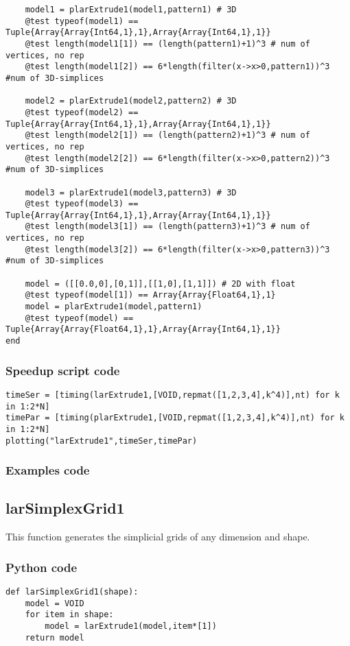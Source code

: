 \documentclass[a4paper,12pt,titlepage]{article}					%
\begin{document}
\begin{Verbatim}
	model1 = plarExtrude1(model1,pattern1) # 3D
	@test typeof(model1) == Tuple{Array{Array{Int64,1},1},Array{Array{Int64,1},1}}
	@test length(model1[1]) == (length(pattern1)+1)^3 # num of vertices, no rep
	@test length(model1[2]) == 6*length(filter(x->x>0,pattern1))^3 #num of 3D-simplices
	
	model2 = plarExtrude1(model2,pattern2) # 3D
	@test typeof(model2) == Tuple{Array{Array{Int64,1},1},Array{Array{Int64,1},1}}
	@test length(model2[1]) == (length(pattern2)+1)^3 # num of vertices, no rep
	@test length(model2[2]) == 6*length(filter(x->x>0,pattern2))^3 #num of 3D-simplices
	
	model3 = plarExtrude1(model3,pattern3) # 3D
	@test typeof(model3) == Tuple{Array{Array{Int64,1},1},Array{Array{Int64,1},1}}
	@test length(model3[1]) == (length(pattern3)+1)^3 # num of vertices, no rep
	@test length(model3[2]) == 6*length(filter(x->x>0,pattern3))^3 #num of 3D-simplices
	
	model = ([[0.0,0],[0,1]],[[1,0],[1,1]]) # 2D with float
	@test typeof(model[1]) == Array{Array{Float64,1},1}
	model = plarExtrude1(model,pattern1)
	@test typeof(model) == Tuple{Array{Array{Float64,1},1},Array{Array{Int64,1},1}}
end
\end{Verbatim}

\subsubsection{Speedup script code}
\begin{Verbatim}
timeSer = [timing(larExtrude1,[VOID,repmat([1,2,3,4],k^4)],nt) for k in 1:2*N]
timePar = [timing(plarExtrude1,[VOID,repmat([1,2,3,4],k^4)],nt) for k in 1:2*N]
plotting("larExtrude1",timeSer,timePar)
\end{Verbatim}

\subsubsection{Examples code}
\lipsum[6]


\subsection{larSimplexGrid1}
This function generates the simplicial grids of any dimension and shape.

\subsubsection{Python code}
\begin{verbatim}
def larSimplexGrid1(shape):
    model = VOID
    for item in shape:
        model = larExtrude1(model,item*[1])
    return model
\end{verbatim}
\end{document}
